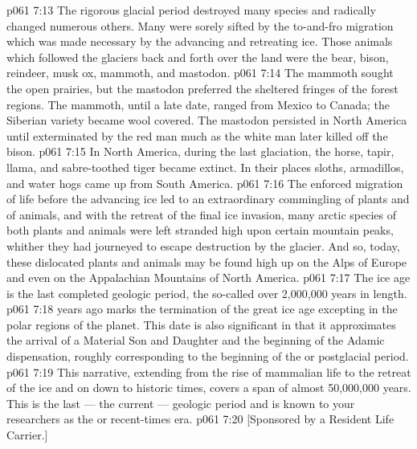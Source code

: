 \vs p061 7:13 The rigorous glacial period destroyed many species and radically changed numerous others. Many were sorely sifted by the to\hyp{}and\hyp{}fro migration which was made necessary by the advancing and retreating ice. Those animals which followed the glaciers back and forth over the land were the bear, bison, reindeer, musk ox, mammoth, and mastodon.
\vs p061 7:14 The mammoth sought the open prairies, but the mastodon preferred the sheltered fringes of the forest regions. The mammoth, until a late date, ranged from Mexico to Canada; the Siberian variety became wool covered. The mastodon persisted in North America until exterminated by the red man much as the white man later killed off the bison.
\vs p061 7:15 In North America, during the last glaciation, the horse, tapir, llama, and sabre\hyp{}toothed tiger became extinct. In their places sloths, armadillos, and water hogs came up from South America.
\vs p061 7:16 The enforced migration of life before the advancing ice led to an extraordinary commingling of plants and of animals, and with the retreat of the final ice invasion, many arctic species of both plants and animals were left stranded high upon certain mountain peaks, whither they had journeyed to escape destruction by the glacier. And so, today, these dislocated plants and animals may be found high up on the Alps of Europe and even on the Appalachian Mountains of North America.
\vs p061 7:17 \pc The ice age is the last completed geologic period, the so\hyp{}called  over 2,000,000 years in length.
\vs p061 7:18 \pc {} years ago marks the termination of the great ice age excepting in the polar regions of the planet. This date is also significant in that it approximates the arrival of a Material Son and Daughter and the beginning of the Adamic dispensation, roughly corresponding to the beginning of the  or postglacial period.
\vs p061 7:19 \pc This narrative, extending from the rise of mammalian life to the retreat of the ice and on down to historic times, covers a span of almost 50,000,000 years. This is the last --- the current --- geologic period and is known to your researchers as the  or recent\hyp{}times era.
\vsetoff
\vs p061 7:20 [Sponsored by a Resident Life Carrier.]
\quizlink
